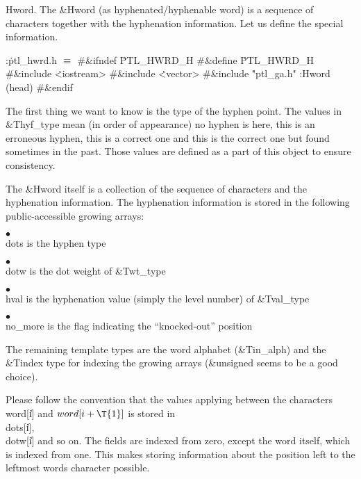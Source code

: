 \fi

Hword. The \&{Hword} (as hyphenated/hyphenable word) is a sequence
of characters together with the hyphenation information. Let us define
the special information.

\Y\B\4:\.{ptl\_hwrd.h }\X${}\equiv{}$\6
\8\#\&{ifndef} \.{PTL\_HWRD\_H}\6
\8\#\&{define} \.{PTL\_HWRD\_H}\6
\8\#\&{include} \.{<iostream>}\6
\8\#\&{include} \.{<vector>}\6
\8\#\&{include} \.{"ptl\_ga.h"}\6
:Hword (head)\X\6
\8\#\&{endif}\par
\fi

The first thing we want to know is the type of the hyphen point. The
values in \&{Thyf\_type} mean (in order of appearance) no hyphen is here,
this is an erroneous hyphen, this is a correct one and this is the
correct one but found sometimes in the past. Those values are defined as
a part of this object to ensure consistency.

The \&{Hword} itself is a collection of the sequence of characters and the
hyphenation information. The hyphenation information is stored in the
following public-accessible growing arrays:

\item{$\bullet$} \\{dots} is the hyphen type
\item{$\bullet$} \\{dotw} is the dot weight of \&{Twt\_type}
\item{$\bullet$} \\{hval} is the hyphenation value (simply the level
number) of \&{Tval\_type}
\item{$\bullet$} \\{no\_more} is the flag indicating the ``knocked-out''
position

The remaining template types are the word alphabet (\&{Tin\_alph}) and the
\&{Tindex} type for indexing the growing arrays (\&{unsigned} seems to be a
good choice).

Please follow the convention that the values applying between the
characters \\{word}[\|i] and $\\{word}[\|i+\T{1}]$ is stored in \\{dots}[\|i], %
\\{dotw}[\|i]
and so on. The fields are indexed from zero, except the word itself, which
is indexed from one. This makes storing information about the position left
to the leftmost words character possible.

